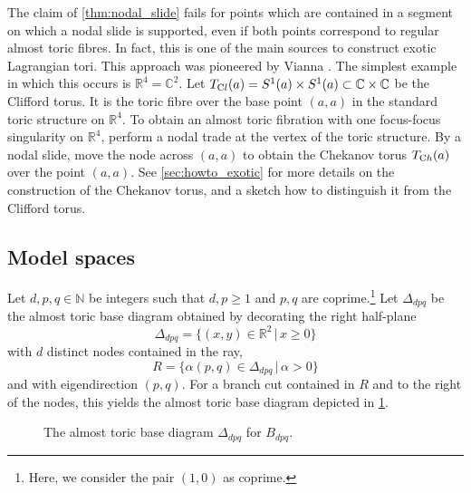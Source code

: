 \documentclass[12pt,a4paper,abstract=true,final]{scrartcl}
\begin{document}
\begin{remark}
    \label{rk:slides_ray}
    The claim of \cref{thm:nodal_slide} fails for points which are contained in a segment on which a nodal slide is supported, even if both points correspond to regular almost toric fibres.
In fact, this is one of the main sources to construct exotic Lagrangian tori.
This approach was pioneered by Vianna \cite{Via16,Via17}.
The simplest example in which this occurs is $\mathbb{R}^4 = \mathbb{C}^2$.
Let $T_{\text Cl}(a) = S^1(a) \times S^1(a) \subset \mathbb{C} \times \mathbb{C}$ be the Clifford torus.
It is the toric fibre over the base point $(a,a)$ in the standard toric structure on $\mathbb{R}^4$.
To obtain an almost toric fibration with one focus-focus singularity on $\mathbb{R}^4$, perform a nodal trade at the vertex of the toric structure.
By a nodal slide, move the node across $(a,a)$ to obtain the Chekanov torus $T_{\text Ch}(a)$ over the point $(a,a)$.
See \cref{sec:howto_exotic} for more details on the construction of the Chekanov torus, and a sketch how to distinguish it from the Clifford torus.
\end{remark}


\subsection{Model spaces}
\label{sec:modelspaces}

Let $d,p,q \in \mathbb{N}$ be integers such that $d,p≥1$ and $p,q$ are coprime.\footnote{Here, we consider the pair $(1,0)$ as coprime.}
Let $\Delta_{dpq}$ be the almost toric base diagram obtained by decorating the right half-plane
$$\Delta_{dpq} = \{ (x,y) \in \mathbb{R}^2 \, \vert \, x ≥ 0 \}$$
with $d$ distinct nodes contained in the ray,
\begin{equation}
  \label{eqn:eigenline}
  R = \{\alpha (p,q) \in \Delta_{dpq} \, \vert \, \alpha > 0 \}
\end{equation}
and with eigendirection $(p,q)$.
For a branch cut contained in $R$ and to the right of the nodes, this yields the almost toric base diagram depicted in \cref{fig:Bdpq_moment_image}.

\begin{figure}
\centering
{}   
\caption{The almost toric base diagram $Δ_{dpq}$ for $B_{dpq}$.}
\label{fig:Bdpq_moment_image}
\end{figure}
\end{document}
